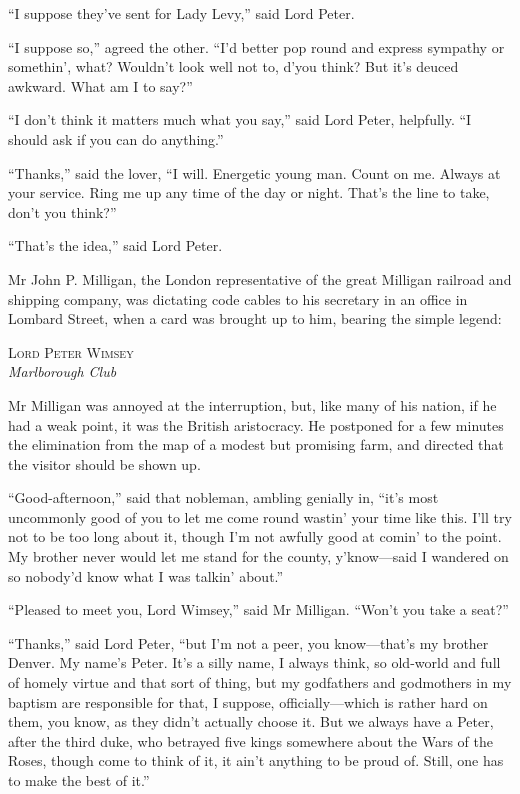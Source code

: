 \enquote{I suppose they’ve sent for Lady Levy,} said Lord Peter.

\enquote{I suppose so,} agreed the other. \enquote{I’d better pop round and express sympathy or somethin’, what? Wouldn’t look well not to, d’you think? But it’s deuced awkward. What am I to say?}

\enquote{I don’t think it matters much what you say,} said Lord Peter, helpfully. \enquote{I should ask if you can do anything.}

\enquote{Thanks,} said the lover, \enquote{I will. Energetic young man. Count on me. Always at your service. Ring me up any time of the day or night. That’s the line to take, don’t you think?}

\enquote{That’s the idea,} said Lord Peter.

Mr John P. Milligan, the London representative of the great Milligan railroad and shipping company, was dictating code cables to his secretary in an office in Lombard Street, when a card was brought up to him, bearing the simple legend:

\begin{center}
\textsc{Lord Peter Wimsey}\\
\textit{Marlborough Club}
\end{center}

Mr Milligan was annoyed at the interruption, but, like many of his nation, if he had a weak point, it was the British aristocracy. He postponed for a few minutes the elimination from the map of a modest but promising farm, and directed that the visitor should be shown up.

\enquote{Good-afternoon,} said that nobleman, ambling genially in, \enquote{it’s most uncommonly good of you to let me come round wastin’ your time like this. I’ll try not to be too long about it, though I’m not awfully good at comin’ to the point. My brother never would let me stand for the county, y’know\allowbreak---\allowbreak said I wandered on so nobody’d know what I was talkin’ about.}

\enquote{Pleased to meet you, Lord Wimsey,} said Mr Milligan. \enquote{Won’t you take a seat?}

\enquote{Thanks,} said Lord Peter, \enquote{but I’m not a peer, you know\allowbreak---\allowbreak that’s my brother Denver. My name’s Peter. It’s a silly name, I always think, so old-world and full of homely virtue and that sort of thing, but my godfathers and godmothers in my baptism are responsible for that, I suppose, officially\allowbreak---\allowbreak which is rather hard on them, you know, as they didn’t actually choose it. But we always have a Peter, after the third duke, who betrayed five kings somewhere about the Wars of the Roses, though come to think of it, it ain’t anything to be proud of. Still, one has to make the best of it.}

